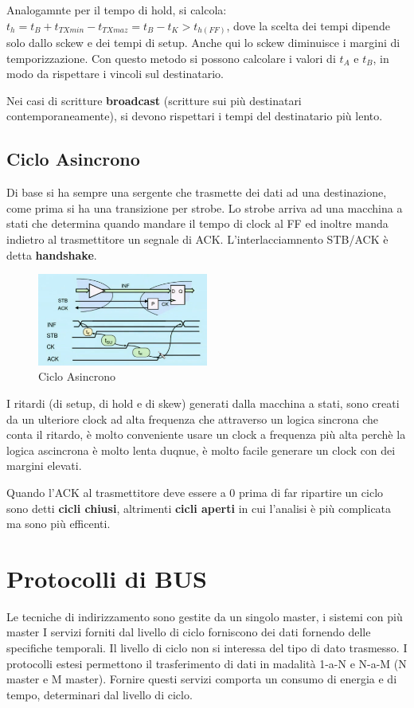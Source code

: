 \documentclass[12pt]{article}
\begin{document}
Analogamnte per il tempo di hold, si calcola: $t_h = t_B + t_{TXmin} - t_{TXmaz} = t_B - t_K > t_{h(FF)}$, dove la scelta dei tempi dipende solo dallo sckew e dei tempi di setup. Anche qui lo sckew diminuisce i margini di temporizzazione. Con questo metodo si possono calcolare i valori di $t_A$ e $t_B$, in modo da rispettare i vincoli sul destinatario.

Nei casi di scritture \textbf{broadcast} (scritture sui pi\`u destinatari contemporaneamente), si devono rispettari i tempi del destinatario pi\`u lento.

\subsection{Ciclo Asincrono}
Di base si ha sempre una sergente che trasmette dei dati ad una destinazione, come prima si ha una transizione per strobe. Lo strobe arriva ad una macchina a stati che determina quando mandare il tempo di clock al FF ed inoltre manda indietro al trasmettitore un segnale di ACK. L'interlacciamnento STB/ACK \`e detta \textbf{handshake}.
\begin{figure}[H]
    \centering
    \includegraphics[width=0.5\textwidth]{ciclo-asincrono.png}
    \caption{Ciclo Asincrono}
    \label{fig:ciclo-asincrono}
\end{figure}
I ritardi (di setup, di hold e di skew) generati dalla macchina a stati, sono creati da un ulteriore clock ad alta frequenza che attraverso un logica sincrona che conta il ritardo, \`e molto conveniente usare un clock a frequenza pi\`u alta perch\`e la logica ascincrona \`e molto lenta duqnue, \`e molto facile generare un clock con dei margini elevati.

Quando l'ACK al trasmettitore deve essere a 0 prima di far ripartire un ciclo sono detti \textbf{cicli chiusi}, altrimenti \textbf{cicli aperti} in cui l'analisi \`e pi\`u complicata ma sono pi\`u efficenti.


\newpage
\section{Protocolli di BUS}
Le tecniche di indirizzamento sono gestite da un singolo master, i sistemi con pi\`u master 
I servizi forniti dal livello di ciclo forniscono dei dati fornendo delle specifiche temporali. Il livello di ciclo non si interessa del tipo di dato trasmesso. I protocolli estesi permettono il trasferimento di dati in madalit\`a 1-a-N e N-a-M (N master e M master). Fornire questi servizi comporta un consumo di energia e di tempo, determinari dal livello di ciclo.
\end{document}
